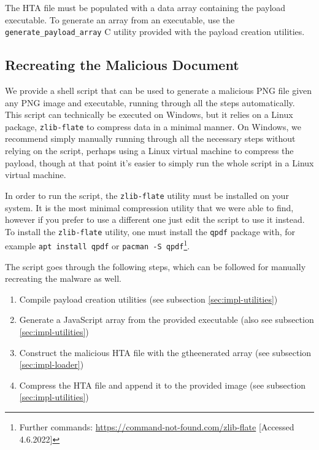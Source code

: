 The \acrshort{HTA} file must be populated with a data array containing the payload executable. To generate an array
from an executable, use the \verb+generate_payload_array+ C utility provided with the payload creation utilities.

\subsection{Recreating the Malicious Document}
We provide a shell script that can be used to generate a malicious \acrshort{PNG} file given any \acrshort{PNG} 
image and executable, running through all the steps automatically. This script can technically be executed on Windows,
but it relies on a Linux package, \verb+zlib-flate+ to compress data in a minimal manner. On Windows, we recommend
simply manually running through all the necessary steps without relying on the script, perhaps using a Linux virtual 
machine to  compress the payload, though at that point it's easier to simply run the whole script in a 
Linux virtual machine.

In order to run the script, the \verb+zlib-flate+ utility must be installed on your system. It is the most minimal
compression utility that we were able to find, however if you prefer to use a different one just edit the script to use
it instead. To install the \verb+zlib-flate+ utility, one must install the \verb+qpdf+ package with, for example
\verb+apt install qpdf+ or \verb+pacman -S qpdf+\footnote{Further commands:
\url{https://command-not-found.com/zlib-flate} [Accessed 4.6.2022]}. 

The script goes through the following steps, which can be followed for manually recreating the malware as well.
\begin{enumerate}
    \item Compile payload creation utilities (see subsection \ref{sec:impl-utilities})
    \item Generate a JavaScript array from the provided executable (also see subsection \ref{sec:impl-utilities})
    \item Construct the malicious \acrshort{HTA} file with the gtheenerated array (see subsection \ref{sec:impl-loader})
    \item Compress the \acrshort{HTA} file and append it to the provided image (see subsection \ref{sec:impl-utilities})
\end{enumerate}

